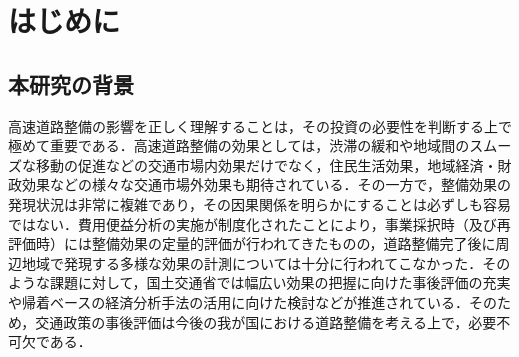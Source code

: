 \chapter{はじめに}

\section{本研究の背景}

高速道路整備の影響を正しく理解することは，その投資の必要性を判断する上で極めて重要である．高速道路整備の効果としては，渋滞の緩和や地域間のスムーズな移動の促進などの交通市場内効果だけでなく，住民生活効果，地域経済・財政効果などの様々な交通市場外効果も期待されている．その一方で，整備効果の発現状況は非常に複雑であり，その因果関係を明らかにすることは必ずしも容易ではない．費用便益分析の実施が制度化されたことにより，事業採択時（及び再評価時）には整備効果の定量的評価が行われてきたものの，道路整備完了後に周辺地域で発現する多様な効果の計測については十分に行われてこなかった．そのような課題に対して，国土交通省では幅広い効果の把握に向けた事後評価の充実や帰着ベースの経済分析手法の活用に向けた検討などが推進されている．そのため，交通政策の事後評価は今後の我が国における道路整備を考える上で，必要不可欠である．

